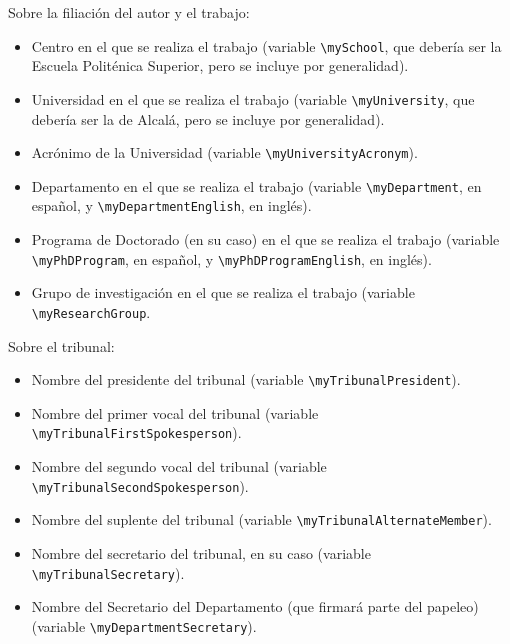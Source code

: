 \documentclass[spanish,openright]{book}
\begin{document}
Sobre la filiación del autor y el trabajo:

\begin{itemize}

\item Centro en el que se realiza el trabajo (variable
  \texttt{\textbackslash{}mySchool}, que debería ser la Escuela
  Politénica Superior, pero se incluye por generalidad).
\item Universidad en el que se realiza el trabajo (variable
  \texttt{\textbackslash{}myUniversity}, que debería ser la de
  Alcalá, pero se incluye por generalidad).
\item Acrónimo de la Universidad (variable
  \texttt{\textbackslash{}myUniversityAcronym}).

\item Departamento en el que se realiza el trabajo (variable
  \texttt{\textbackslash{}myDepartment}, en español, y
  \texttt{\textbackslash{}myDepartmentEnglish}, en inglés).
  
\item Programa de Doctorado (en su caso) en el que se realiza el
  trabajo (variable \texttt{\textbackslash{}myPhDProgram}, en español,
  y \texttt{\textbackslash{}myPhDProgramEnglish}, en inglés).
\item Grupo de investigación en el que se realiza el trabajo (variable
  \texttt{\textbackslash{}myResearchGroup}.

  \end{itemize}

Sobre el tribunal:

\begin{itemize}

\item Nombre del presidente del tribunal (variable
  \texttt{\textbackslash{}myTribunalPresident}).
\item Nombre del primer vocal del tribunal (variable
  \texttt{\textbackslash{}myTribunalFirstSpokesperson}).
\item Nombre del segundo vocal del tribunal (variable
  \texttt{\textbackslash{}myTribunalSecondSpokesperson}).
\item Nombre del suplente del tribunal (variable
  \texttt{\textbackslash{}myTribunalAlternateMember}).
\item Nombre del secretario del tribunal, en su caso (variable
  \texttt{\textbackslash{}myTribunalSecretary}).
\item Nombre del Secretario del Departamento (que firmará parte del
  papeleo) (variable \texttt{\textbackslash{}myDepartmentSecretary}).

\end{itemize}
\end{document}
